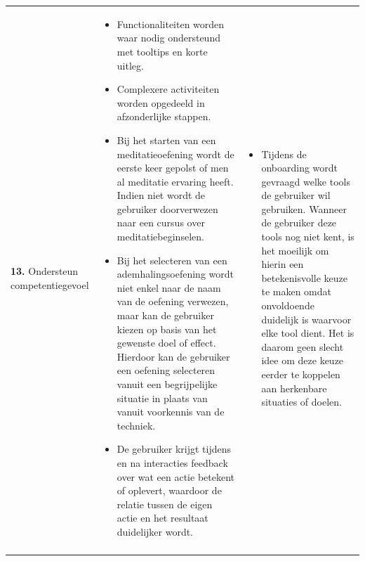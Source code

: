 {\begin{longtable}{
            >{\raggedright\arraybackslash}p{5.23cm}
            >{\raggedright\arraybackslash}p{4.93cm}
            >{\raggedright\arraybackslash}p{4.93cm}
        }
        \textbf{13.} Ondersteun competentiegevoel
        &  
        \begin{itemize}[nosep,leftmargin=*,itemsep=10pt] 
            \renewcommand{\labelitemi}{+} 
            \item Functionaliteiten worden waar nodig ondersteund met tooltips en korte uitleg.
            \item Complexere activiteiten worden opgedeeld in afzonderlijke stappen.
            \item Bij het starten van een meditatieoefening wordt de eerste keer gepolst of men al meditatie ervaring heeft. Indien niet wordt de gebruiker doorverwezen naar een cursus over meditatiebeginselen.
            \item Bij het selecteren van een ademhalingsoefening wordt niet enkel naar de naam van de oefening verwezen, maar kan de gebruiker kiezen op basis van het gewenste doel of effect. Hierdoor kan de gebruiker een oefening selecteren vanuit een begrijpelijke situatie in plaats van vanuit voorkennis van de techniek.
            \item De gebruiker krijgt tijdens en na interacties feedback over wat een actie betekent of oplevert, waardoor de relatie tussen de eigen actie en het resultaat duidelijker wordt.
        \end{itemize} 
        &  
        \begin{itemize}[nosep,leftmargin=*,itemsep=10pt] 
            \renewcommand{\labelitemi}{-} 
            \item Tijdens de onboarding wordt gevraagd welke tools de gebruiker wil gebruiken. Wanneer de gebruiker deze tools nog niet kent, is het moeilijk om hierin een betekenisvolle keuze te maken omdat onvoldoende duidelijk is waarvoor elke tool dient. Het is daarom geen slecht idee om deze keuze eerder te koppelen aan herkenbare situaties of doelen.
        \end{itemize} 
        \\
        
        \addlinespace[5pt]
        

\end{longtable}}
